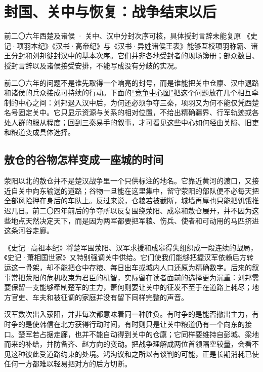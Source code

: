 \section{封国、关中与恢复：战争结束以后}
\label{sec:han-founding-recovery}

\begin{event}{}{前二〇六年}{西楚及诸侯 · 关中、汉中}{分封次序可核，具体授封言辞未能复原}
《史记·项羽本纪》《汉书·高帝纪》与《汉书·异姓诸侯王表》能够互校项羽称霸、诸王分封和刘邦徙封汉中的基本次序。它们并非各地受封者的现场簿册；部众数目、授封言辞以及诸侯接受安排，不能写成没有分歧的实况。
\end{event}

前二〇六年的问题不是谁先取得一个响亮的封号，而是谁能把关中仓廪、汉中退路和诸侯的兵众接成可持续的行动。下面的\hyperref[fig:qin-han-centers]{“竞争中心图”}把这个问题放在几个相互牵制的中心之间：刘邦退入汉中后，为何还必须争夺三秦，项羽又为何不能仅凭西楚名号固定关中。它只显示资源与关系的相对位置，不给出精确疆界、行军轨迹或各处人群的服从程度；回到三秦易手的叙事，才可看见这些中心如何经由关隘、旧吏和粮道变成具体选择。


\subsection{敖仓的谷物怎样变成一座城的时间}

荥阳以北的敖仓并不是楚汉战争里一个只供标注的地名。它靠近黄河的渡口，又接近自关中向东输送的道路；谷物一旦能在这里集中，留守荥阳的部队便不必每天把全部风险押在身后的车队上。反过来说，仓粮若被截断，城墙再厚也只能把饥饿推迟几日。前二〇四年前后的争夺所以反复围绕荥阳、成皋和敖仓展开，并不因为这些地点天然决定天下，而是因为两军都要把军粮、伤兵、使者和可动用的马匹挤进这条河谷走廊。

《史记·高祖本纪》将楚军围荥阳、汉军求援和成皋得失组织成一段连续的战局，《史记·萧相国世家》又特别强调关中供给。它们使我们能够把握汉军依赖后方转运这一骨架，却不能把仓中存粮、每日出车或城内人口还原为精确数字。后来的叙事常把荥阳的危机收束为君臣的机智，实际留在读者面前的选择更为沉重：刘邦需要保留一支能够牵制楚军的主力，萧何则要让关中的征发不至于在道路上耗尽；地方官吏、车夫和被征调的家庭并没有留下同样完整的声音。

汉军数次出入荥阳，并非每次都意味着同一种胜负。有时争的是能否撤出主力，有时争的是使韩信在北方获得行动时间，有时则只是让关中粮道仍有一个向东的接口。楚军若占据走廊，也并不能自动得到关中的仓廪；它同样要维持自彭城、梁地而来的补给，并防备齐、赵方向的变动。把战争理解成两位首领隔空较量，会看不见这种彼此受道路约束的处境。鸿沟议和之所以有谈判的可能，正是长期消耗已使任何一方都难以轻易把对方的后方切断。

